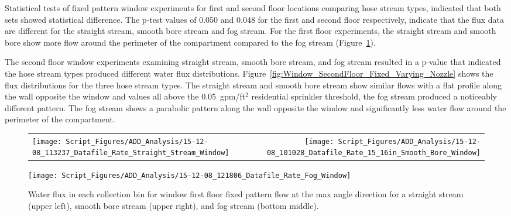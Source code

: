\documentclass[12pt,oneside]{book}
\begin{document}
\clearpage

Statistical tests of fixed pattern window experiments for first and second floor locations comparing hose stream types, indicated that both sets showed statistical difference. The p-test values of 0.050 and 0.048  for the first and second floor respectively, indicate that the flux data are different for the straight stream, smooth bore stream and fog stream. For the first floor experiments, the straight stream and smooth bore show more flow around the perimeter of the compartment compared to the fog stream (Figure~\ref{fig:Window_FirstFloor_Fixed_Varying_Nozzle}).

The second floor window experiments examining straight stream, smooth bore stream, and fog stream resulted in a p-value that indicated the hose stream types produced different water flux distributions. Figure~\ref{fig:Window_SecondFloor_Fixed_Varying_Nozzle} shows the flux distributions for the three hose stream types. The straight stream and smooth bore stream show similar flows with a flat profile along the wall opposite the window and values all above the 0.05~gpm/ft$^2$ residential sprinkler threshold, the fog stream produced a noticeably different pattern. The fog stream shows a parabolic pattern along the wall opposite the window and significantly less water flow around the perimeter of the compartment. 

\begin{figure}[ht]
\begin{tabular*}{\textwidth}{lr}
\texttt{[image: Script\_Figures/ADD\_Analysis/15-12-08\_113237\_Datafile\_Rate\_Straight\_Stream\_Window]} &
\texttt{[image: Script\_Figures/ADD\_Analysis/15-12-08\_101028\_Datafile\_Rate\_15\_16in\_Smooth\_Bore\_Window]} \\
\end{tabular*}
\centering
\texttt{[image: Script\_Figures/ADD\_Analysis/15-12-08\_121806\_Datafile\_Rate\_Fog\_Window]}
\caption[Water Flux for Varying Window First Floor Fixed Pattern Hose Stream Types]{Water flux in each collection bin for window first floor fixed pattern flow at the max angle direction for a straight stream (upper left), smooth bore stream (upper right), and fog stream (bottom middle).}
\label{fig:Window_FirstFloor_Fixed_Varying_Nozzle}
\end{figure}
\end{document}
